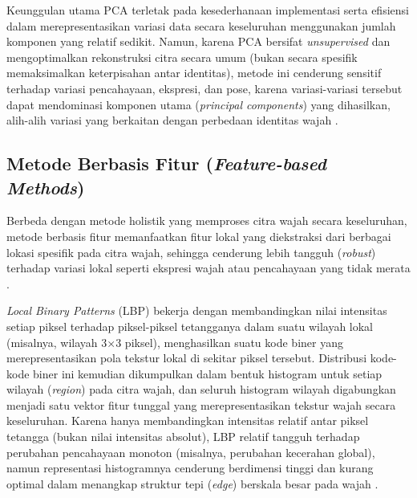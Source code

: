 Keunggulan utama PCA terletak pada kesederhanaan implementasi serta efisiensi dalam merepresentasikan variasi data secara keseluruhan menggunakan jumlah komponen yang relatif sedikit. Namun, karena PCA bersifat \textit{unsupervised} dan mengoptimalkan rekonstruksi citra secara umum (bukan secara spesifik memaksimalkan keterpisahan antar identitas), metode ini cenderung sensitif terhadap variasi pencahayaan, ekspresi, dan pose, karena variasi-variasi tersebut dapat mendominasi komponen utama (\textit{principal components}) yang dihasilkan, alih-alih variasi yang berkaitan dengan perbedaan identitas wajah \autocite{Belhumeur1997}.

\subsection{Metode Berbasis Fitur (\textit{Feature-based Methods})}

Berbeda dengan metode holistik yang memproses citra wajah secara keseluruhan, metode berbasis fitur memanfaatkan fitur lokal yang diekstraksi dari berbagai lokasi spesifik pada citra wajah, sehingga cenderung lebih tangguh (\textit{robust}) terhadap variasi lokal seperti ekspresi wajah atau pencahayaan yang tidak merata \autocite{Trigueros2018}.

\textit{Local Binary Patterns} (LBP) bekerja dengan membandingkan nilai intensitas setiap piksel terhadap piksel-piksel tetangganya dalam suatu wilayah lokal (misalnya, wilayah 3×3 piksel), menghasilkan suatu kode biner yang merepresentasikan pola tekstur lokal di sekitar piksel tersebut. Distribusi kode-kode biner ini kemudian dikumpulkan dalam bentuk histogram untuk setiap wilayah (\textit{region}) pada citra wajah, dan seluruh histogram wilayah digabungkan menjadi satu vektor fitur tunggal yang merepresentasikan tekstur wajah secara keseluruhan. Karena hanya membandingkan intensitas relatif antar piksel tetangga (bukan nilai intensitas absolut), LBP relatif tangguh terhadap perubahan pencahayaan monoton (misalnya, perubahan kecerahan global), namun representasi histogramnya cenderung berdimensi tinggi dan kurang optimal dalam menangkap struktur tepi (\textit{edge}) berskala besar pada wajah \autocite{ahonen2006face,Trigueros2018}.

